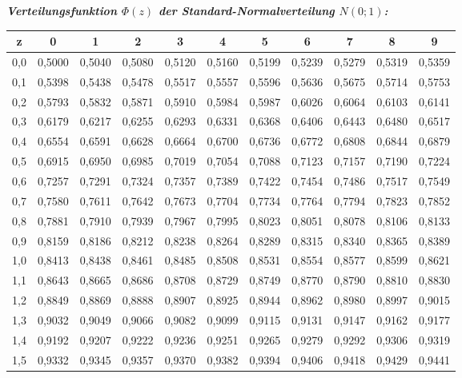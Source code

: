 \noindent
{\bf \slshape \sffamily Verteilungsfunktion $\Phi(z)$ der Standard-Normalverteilung $N(0;1)$:}\\

\begin{table}[h]
	\small
\begin{tabular}{|c|ccccc|ccccc|}
\hline
z & 0 & 1 & 2 & 3 & 4 & 5 & 6 & 7 & 8 & 9 \\ \hline
0,0 & 0,5000 & 0,5040 & 0,5080 & 0,5120 & 0,5160 & 0,5199 & 0,5239 & 0,5279 & 0,5319 & 0,5359 \\
0,1 & 0,5398 & 0,5438 & 0,5478 & 0,5517 & 0,5557 & 0,5596 & 0,5636 & 0,5675 & 0,5714 & 0,5753 \\
0,2 & 0,5793 & 0,5832 & 0,5871 & 0,5910 & 0,5984 & 0,5987 & 0,6026 & 0,6064 & 0,6103 & 0,6141 \\
0,3 & 0,6179 & 0,6217 & 0,6255 & 0,6293 & 0,6331 & 0,6368 & 0,6406 & 0,6443 & 0,6480 & 0,6517 \\
0,4 & 0,6554 & 0,6591 & 0,6628 & 0,6664 & 0,6700 & 0,6736 & 0,6772 & 0,6808 & 0,6844 & 0,6879 \\
0,5 & 0,6915 & 0,6950 & 0,6985 & 0,7019 & 0,7054 & 0,7088 & 0,7123 & 0,7157 & 0,7190 & 0,7224 \\ \hline
0,6 & 0,7257 & 0,7291 & 0,7324 & 0,7357 & 0,7389 & 0,7422 & 0,7454 & 0,7486 & 0,7517 & 0,7549 \\
0,7 & 0,7580 & 0,7611 & 0,7642 & 0,7673 & 0,7704 & 0,7734 & 0,7764 & 0,7794 & 0,7823 & 0,7852 \\
0,8 & 0,7881 & 0,7910 & 0,7939 & 0,7967 & 0,7995 & 0,8023 & 0,8051 & 0,8078 & 0,8106 & 0,8133 \\
0,9 & 0,8159 & 0,8186 & 0,8212 & 0,8238 & 0,8264 & 0,8289 & 0,8315 & 0,8340 & 0,8365 & 0,8389 \\
1,0 & 0,8413 & 0,8438 & 0,8461 & 0,8485 & 0,8508 & 0,8531 & 0,8554 & 0,8577 & 0,8599 & 0,8621 \\ \hline
1,1 & 0,8643 & 0,8665 & 0,8686 & 0,8708 & 0,8729 & 0,8749 & 0,8770 & 0,8790 & 0,8810 & 0,8830 \\
1,2 & 0,8849 & 0,8869 & 0,8888 & 0,8907 & 0,8925 & 0,8944 & 0,8962 & 0,8980 & 0,8997 & 0,9015 \\
1,3 & 0,9032 & 0,9049 & 0,9066 & 0,9082 & 0,9099 & 0,9115 & 0,9131 & 0,9147 & 0,9162 & 0,9177 \\
1,4 & 0,9192 & 0,9207 & 0,9222 & 0,9236 & 0,9251 & 0,9265 & 0,9279 & 0,9292 & 0,9306 & 0,9319 \\
1,5 & 0,9332 & 0,9345 & 0,9357 & 0,9370 & 0,9382 & 0,9394 & 0,9406 & 0,9418 & 0,9429 & 0,9441 \\ \hline

\end{tabular}
\end{table}
